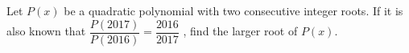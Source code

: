 Let $P(x)$ be a quadratic polynomial with two consecutive integer roots. If it is also known that $\dfrac{P(2017)}{P(2016)} = \dfrac{2016}{2017}$ , find the larger root of $P(x)$.
